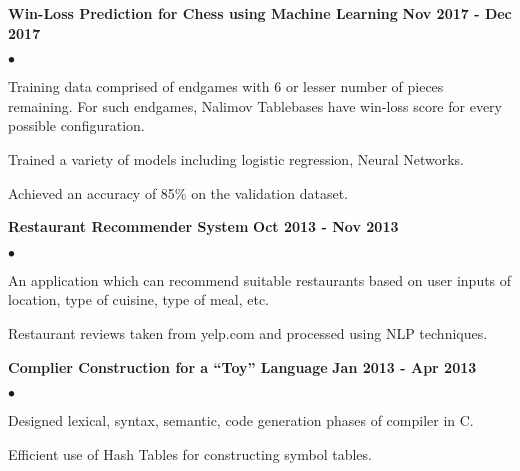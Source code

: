 \documentclass[margin,line]{res}
\newenvironment{list2}{
  \begin{list}{$\bullet$}{%
      \setlength{\itemsep}{0in}
      \setlength{\parsep}{0in} \setlength{\parskip}{0in}
      \setlength{\topsep}{0in} \setlength{\partopsep}{0in} 
      \setlength{\leftmargin}{0.2in}}}{\end{list}}
\begin{document}
\begin{resume}
{\bf Win-Loss Prediction for Chess using Machine Learning} \hfill {\bf Nov 2017 - Dec 2017}\\

\vspace{-.3cm}
\begin{list2}
\item Training data comprised of endgames with 6 or lesser number of pieces remaining.
For such endgames, Nalimov Tablebases have win-loss score for every possible configuration.
\item Trained a variety of models including logistic regression, Neural Networks.
\item Achieved an accuracy of 85\% on the validation dataset.
\end{list2}

{\bf Restaurant Recommender System} \hfill {\bf Oct 2013 - Nov 2013}\\

\vspace{-.3cm}
\begin{list2}
\item An application which can recommend suitable restaurants based on user inputs of location, type of
cuisine, type of meal, etc.
\item Restaurant reviews taken from yelp.com and processed using NLP techniques.
\end{list2}

{\bf Complier Construction for a “Toy” Language} \hfill {\bf Jan 2013 - Apr 2013}\\

\vspace{-.3cm}
\begin{list2}
\item Designed lexical, syntax, semantic, code generation phases of compiler in C.
\item Efficient use of Hash Tables for constructing symbol tables.
\end{list2}

%





\end{resume}
\end{document}

